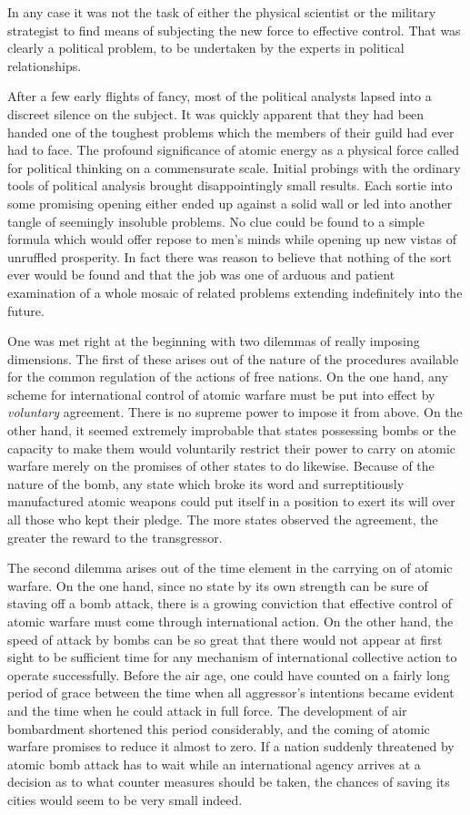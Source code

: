\begin{introduction}
In any case it was not the task of either the physical scientist or the military strategist to find means of subjecting the new force to effective control. That was clearly a political problem, to be undertaken by the experts in political relationships.

After a few early flights of fancy, most of the political analysts lapsed into a discreet silence on the subject. It was quickly apparent that they had been handed one of the toughest problems which the members of their guild had ever had to face. The profound significance of atomic energy as a physical force called for political thinking on a commensurate scale. Initial probings with the ordinary tools of political analysis brought disappointingly small results. Each sortie into some promising opening either ended up against a solid wall or led into another tangle of seemingly insoluble problems. No clue could be found to a simple formula which would offer repose to men's minds while opening up new vistas of unruffled prosperity. In fact there was reason to believe that nothing of the sort ever would be found and that the job was one of arduous and patient examination of a whole mosaic of related problems extending indefinitely into the future.

One was met right at the beginning with two dilemmas of really imposing dimensions. The first of these arises out of the nature of the procedures available for the common regulation of the actions of free nations. On the one hand, any scheme for international control of atomic warfare must be put into effect by \emph{voluntary} agreement. There is no supreme power to impose it from above. On the other hand, it seemed extremely improbable that states possessing bombs or the capacity to make them would voluntarily restrict their power to carry on atomic warfare merely on the promises of other states to do likewise. Because of the nature of the bomb, any state which broke its word and surreptitiously manufactured atomic weapons could put itself in a position to exert its will over all those who kept their pledge. The more states observed the agreement, the greater the reward to the transgressor.

The second dilemma arises out of the time element in the carrying on of atomic warfare. On the one hand, since no state by its own strength can be sure of staving off a bomb attack, there is a growing conviction that effective control of atomic warfare must come through international action. On the other hand, the speed of attack by bombs can be so great that there would not appear at first sight to be sufficient time for any mechanism of international collective action to operate successfully. Before the air age, one could have counted on a fairly long period of grace between the time when all aggressor's intentions became evident and the time when he could attack in full force. The development of air bombardment shortened this period considerably, and the coming of atomic warfare promises to reduce it almost to zero. If a nation suddenly threatened by atomic bomb attack has to wait while an international agency arrives at a decision as to what counter measures should be taken, the chances of saving its cities would seem to be very small indeed.


\end{introduction}

